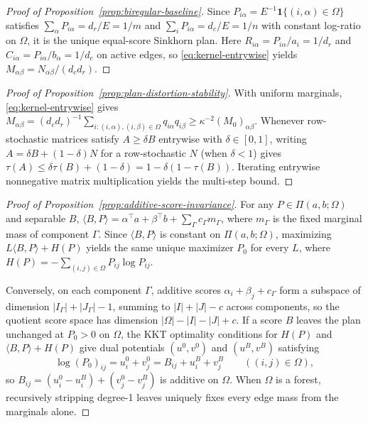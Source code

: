 \documentclass[10pt]{article}
\newcommand{\one}{\mathbf{1}}
\begin{document}
\begin{proof}[Proof of Proposition~\ref{prop:biregular-baseline}]
Since $P_{i\alpha} = E^{-1}\one\{(i,\alpha)\in\Omega\}$ satisfies $\sum_\alpha P_{i\alpha} = d_r / E = 1/m$ and $\sum_i P_{i\alpha} = d_c / E = 1/n$ with constant log-ratio on $\Omega$, it is the unique equal-score Sinkhorn plan. Here $R_{i\alpha} = P_{i\alpha}/a_i = 1/d_r$ and $C_{i\alpha} = P_{i\alpha}/b_\alpha = 1/d_c$ on active edges, so \eqref{eq:kernel-entrywise} yields $M_{\alpha\beta} = N_{\alpha\beta}/(d_c d_r)$.
\end{proof}

\begin{proof}[Proof of Proposition~\ref{prop:plan-distortion-stability}]
With uniform marginals, \eqref{eq:kernel-entrywise} gives $M_{\alpha\beta} = (d_c d_r)^{-1}\sum_{i:(i,\alpha),(i,\beta)\in\Omega} q_{i\alpha} q_{i\beta} \ge \kappa^{-2} (M_0)_{\alpha\beta}$. Whenever row-stochastic matrices satisfy $A \ge \delta B$ entrywise with $\delta \in [0,1]$, writing $A = \delta B + (1-\delta)N$ for a row-stochastic $N$ (when $\delta < 1$) gives $\tau(A) \le \delta\tau(B) + (1-\delta) = 1 - \delta(1-\tau(B))$. Iterating entrywise nonnegative matrix multiplication yields the multi-step bound.
\end{proof}

\begin{proof}[Proof of Proposition~\ref{prop:additive-score-invariance}]
For any $P \in \Pi(a,b;\Omega)$ and separable $B$, $\langle B, P \rangle = \alpha^\top a + \beta^\top b + \sum_\Gamma c_\Gamma m_\Gamma$, where $m_\Gamma$ is the fixed marginal mass of component $\Gamma$. Since $\langle B, P\rangle$ is constant on $\Pi(a,b;\Omega)$, maximizing $L\langle B, P\rangle + H(P)$ yields the same unique maximizer $P_0$ for every $L$, where $H(P) = -\sum_{(i,j)\in\Omega} P_{ij}\log P_{ij}$.

Conversely, on each component $\Gamma$, additive scores $\alpha_i + \beta_j + c_\Gamma$ form a subspace of dimension $|I_\Gamma| + |J_\Gamma| - 1$, summing to $|I| + |J| - c$ across components, so the quotient score space has dimension $|\Omega| - |I| - |J| + c$. If a score $B$ leaves the plan unchanged at $P_0 > 0$ on $\Omega$, the KKT optimality conditions for $H(P)$ and $\langle B, P\rangle + H(P)$ give dual potentials $(u^0, v^0)$ and $(u^B, v^B)$ satisfying
\[
  \log(P_0)_{ij} = u_i^0 + v_j^0 = B_{ij} + u_i^B + v_j^B \qquad ((i,j)\in\Omega),
\]
so $B_{ij} = (u_i^0 - u_i^B) + (v_j^0 - v_j^B)$ is additive on $\Omega$. When $\Omega$ is a forest, recursively stripping degree-1 leaves uniquely fixes every edge mass from the marginals alone.
\end{proof}
\end{document}
